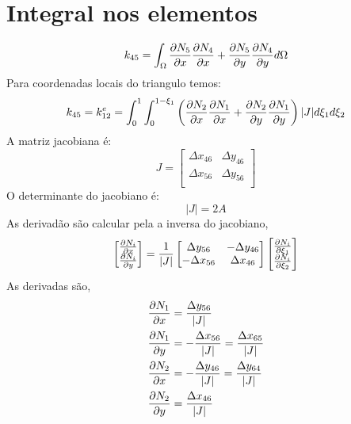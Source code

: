 \section{Integral nos elementos}

\begin{equation}
k_{45} = \int_{\Omega} \frac{\partial N_5}{\partial x}\frac{\partial N_4}{\partial x} + \frac{\partial N_5}{\partial y}\frac{\partial N_4}{\partial y} d \Omega
\end{equation}
%
Para coordenadas locais do triangulo temos: 
%
\begin{equation}
k_{45} = k^e_{12} = \int_{0}^{1} \int_{0}^{1-\xi_1} \left( \frac{\partial N_2}{\partial x}\frac{\partial N_1}{\partial x} + \frac{\partial N_2}{\partial y}\frac{\partial N_1}{\partial y} \right) |J| d \xi_1 d \xi_2 
\end{equation}
%
A matriz jacobiana é:
%
\begin{equation}
	J = 
	\begin{bmatrix}
		\Delta x_{46} & \Delta y_{46}\\
		\Delta x_{56} & \Delta y_{56}\\
	\end{bmatrix}
\end{equation}
%
O determinante do jacobiano é:
%
\begin{equation}
	|J| = 2A
\end{equation}
%
As derivadão são calcular pela a inversa do jacobiano,
%
\begin{equation}
	\begin{bmatrix}
	\frac{\partial N_i}{\partial x}\\
	\frac{\partial N_i}{\partial y}\\
	\end{bmatrix}	
	=
	\frac{1}{|J|}
	\begin{bmatrix}
	\Delta y_{56}&-\Delta y_{46}\\
	-\Delta x_{56}&\Delta x_{46}\\
	\end{bmatrix}
	\begin{bmatrix}
	\frac{\partial N_i}{\partial \xi_1}\\
	\frac{\partial N_i}{\partial \xi_2}\\
\end{bmatrix}
\end{equation}
%
As derivadas são,
%
\begin{equation}
\begin{split}
	&\frac{\partial N_1}{\partial x} =  \frac{\Delta y_{56}}{|J|}\\
	&\frac{\partial N_1}{\partial y} = -\frac{\Delta x_{56}}{|J|} = \frac{\Delta x_{65}}{|J|}\\
	&\frac{\partial N_2}{\partial x} = -\frac{\Delta y_{46}}{|J|} = \frac{\Delta y_{64}}{|J|}\\
	&\frac{\partial N_2}{\partial y} =  \frac{\Delta x_{46}}{|J|}\\		
\end{split}
\end{equation}
